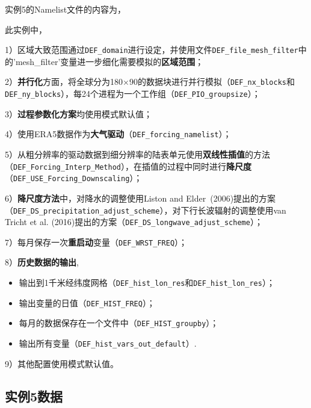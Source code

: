实例5的Namelist文件的内容为，


此实例中，\par
1）区域大致范围通过\texttt{DEF\_domain}进行设定，并使用文件\texttt{DEF\_file\_mesh\_filter}中的'mesh\_filter'变量进一步细化需要模拟的\textbf{区域范围}；\par
2）\textbf{并行化}方面，将全球分为180\textdegree$\times$90\textdegree 的数据块进行并行模拟（\texttt{DEF\_nx\_blocks}和\texttt{DEF\_ny\_blocks}），每24个进程为一个工作组（\texttt{DEF\_PIO\_groupsize}）；\par
3）\textbf{过程参数化方案}均使用模式默认值；\par
4）使用ERA5数据作为\textbf{大气驱动}（\texttt{DEF\_forcing\_namelist}）；\par
5）从粗分辨率的驱动数据到细分辨率的陆表单元使用\textbf{双线性插值}的方法\\ （\texttt{DEF\_Forcing\_Interp\_Method}），在插值的过程中同时进行\textbf{降尺度}\\ （\texttt{DEF\_USE\_Forcing\_Downscaling}）；\par
6）\textbf{降尺度方法}中，对降水的调整使用Liston and Elder~(2006)提出的方案\\ （\texttt{DEF\_DS\_precipitation\_adjust\_scheme}），对下行长波辐射的调整使用van Tricht et al. (2016)提出的方案（\texttt{DEF\_DS\_longwave\_adjust\_scheme}）；\par
7）每月保存一次\textbf{重启动}变量（\texttt{DEF\_WRST\_FREQ}）；\par
8）\textbf{历史数据的输出},
\begin{itemize}[nosep,leftmargin=4em]
    \item 输出到1千米经纬度网格（\texttt{DEF\_hist\_lon\_res}和\texttt{DEF\_hist\_lon\_res}）；
    \item 输出变量的日值（\texttt{DEF\_HIST\_FREQ}）；
    \item 每月的数据保存在一个文件中（\texttt{DEF\_HIST\_groupby}）；
    \item 输出所有变量（\texttt{DEF\_hist\_vars\_out\_default}）.
\end{itemize}\par
9）其他配置使用模式默认值。

\subsection{实例5数据}

